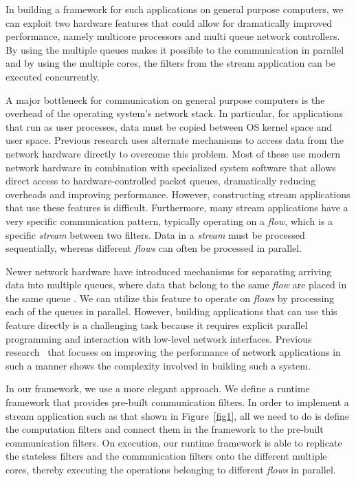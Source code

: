 \documentclass[10pt, conference, compsocconf, reqno]{IEEEtran}
\newcommand{\comment}[1]{}
\begin{document}
In building a framework for such applications on general purpose computers, we can exploit two hardware features that could allow for dramatically improved performance, namely multicore processors and multi queue network controllers. By using the multiple queues makes it possible to the communication in parallel and by using the multiple cores, the filters from the stream application can be executed concurrently.

A major bottleneck for communication on general purpose computers is the overhead of the operating system's network stack. In particular, for applications that run as user processes, data must be copied between OS kernel space and user space. Previous research uses alternate mechanisms to access data from the network hardware directly to overcome this problem\cite{Dobrescu09routebricks:exploiting}\cite{Han:2010:PGS:1851275.1851207}\cite{Kohler2000}. Most of these use modern network hardware in combination with specialized system software that allows direct access to hardware-controlled packet queues, dramatically reducing overheads and improving performance. However, constructing stream applications that use these features is difficult. Furthermore, many stream applications have a very specific communication pattern, typically operating on a \textit{flow}, which is a specific \textit{stream} between two filters. Data in a \textit{stream} must be processed sequentially, whereas different \textit{flows} can often be processed in parallel.

Newer network hardware have introduced mechanisms for separating arriving data into multiple queues, where data that belong to the same \textit{flow} are\comment{ guaranteed to be} placed in the same queue\cite{micro2008} \cite{intel2010}. We can utilize this feature to operate on \textit{flows} by processing each of the queues in parallel. However, building applications that can use this feature directly is a challenging task because it requires explicit parallel programming and interaction with low-level network interfaces. Previous research~\cite{Dobrescu09routebricks:exploiting,Han:2010:PGS:1851275.1851207} that focuses on improving the performance of network applications in such a manner shows the complexity involved in building such a system.

\comment{We parallelize both the application and packet operations to gain significant improvement in performance.}

In our framework, we use a more elegant approach. We define a runtime framework that provides pre-built communication filters. In order to implement a stream application such as that shown in Figure~\ref{fig1}, all we need to do is define the computation filters and connect them in the framework to the pre-built communication filters. On execution, our runtime framework is able to replicate the stateless filters and the communication filters onto the different multiple cores, thereby executing the operations belonging to different \textit{flows} in parallel.
\end{document}
